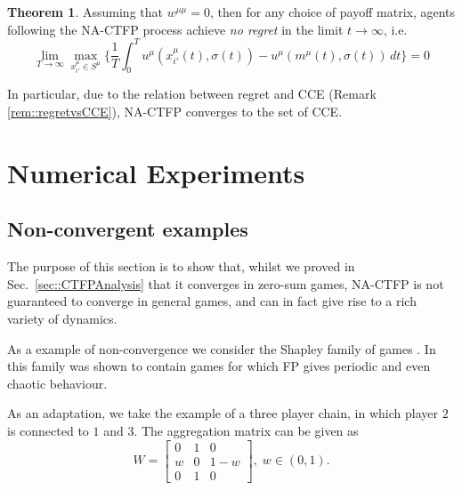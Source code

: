 \documentclass{article}
\theoremstyle{definition}
\newtheorem{theorem}{Theorem}
\begin{document}
  \begin{theorem} \label{thm::NACTFPtoCCE}
    Assuming that $w^{\mu \mu} = 0$, then for any choice of payoff matrix, agents following the
    NA-CTFP process achieve \emph{no regret} in the limit $t \rightarrow \infty$, i.e.
    \begin{equation}
      \lim_{T \rightarrow \infty} \max_{x_{i'}^\mu \in S^\mu} \Big\{ \frac{1}{T} \int_{0}^{T} u^{\mu}(x_{i'}^\mu(t), \sigma(t)) - u^{\mu}(m^\mu(t), \sigma(t)) \, dt \Big\} = 0
    \end{equation}

    In particular, due to the relation between regret and CCE (Remark \ref{rem::regretvsCCE}), NA-CTFP converges to the set of CCE.

  \end{theorem}
  

\section{Numerical Experiments}

  \subsection{Non-convergent examples} \label{sec::NonConv}

  The purpose of this section is to show that, whilst we proved in Sec.~\ref{sec::CTFPAnalysis}
  that it converges in zero-sum games, NA-CTFP is not guaranteed to
  converge in general games, and can in fact give rise to a rich
  variety of dynamics.

  As a example of non-convergence we consider the Shapley family of games \cite{Shapley2016}. In \cite{VanStrien2011} this family was shown to contain games for which FP gives periodic and even chaotic behaviour.

  As an adaptation, we take the example of a three player chain, in which player $2$ is connected to $1$ and $3$. The aggregation matrix can be given as
%
  \begin{equation}
    W = \begin{bmatrix}
      0 & 1 & 0 \\
      w & 0 & 1 - w \\
      0 & 1 & 0
    \end{bmatrix}, \; w \in (0, 1).
  \end{equation}
\end{document}
